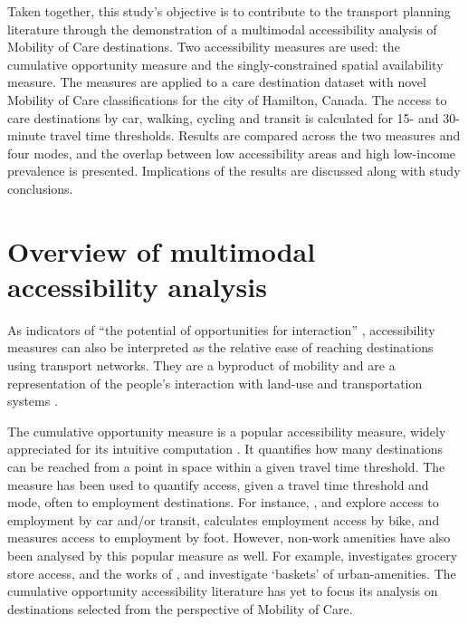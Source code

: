 \documentclass[
  authoryear,
  preprint,
  3p]{elsarticle}
\begin{document}
Taken together, this study's objective is to contribute to the transport
planning literature through the demonstration of a multimodal
accessibility analysis of Mobility of Care destinations. Two
accessibility measures are used: the cumulative opportunity measure and
the singly-constrained spatial availability measure. The measures are
applied to a care destination dataset with novel Mobility of Care
classifications for the city of Hamilton, Canada. The access to care
destinations by car, walking, cycling and transit is calculated for 15-
and 30-minute travel time thresholds. Results are compared across the
two measures and four modes, and the overlap between low accessibility
areas and high low-income prevalence is presented. Implications of the
results are discussed along with study conclusions.

\section{Overview of multimodal accessibility
analysis}\label{overview-of-multimodal-accessibility-analysis}

As indicators of ``the potential of opportunities for interaction''
\citep{hansenHowAccessibilityShapes1959}, accessibility measures can
also be interpreted as the relative ease of reaching destinations using
transport networks. They are a byproduct of mobility and are a
representation of the people's interaction with land-use and
transportation systems
\citep{hansenHowAccessibilityShapes1959, handyAccessibilityIdeaWhose2020, elgeneidyMakingAccessibilityWork2021}.

The cumulative opportunity measure is a popular accessibility measure,
widely appreciated for its intuitive computation
\citep{handyAccessibilityIdeaWhose2020, handyMeasuringAccessibilityExploration1997, kelobonyeRelativeAccessibilityAnalysis2019, chengInvestigatingWalkingAccessibility2019}.
It quantifies how many destinations can be reached from a point in space
within a given travel time threshold. The measure has been used to
quantify access, given a travel time threshold and mode, often to
employment destinations. For instance,
\citet{kapatsilaResolvingAccessibilityDilemma2023},
\citet{deboosereEvaluatingEquityAccessibility2018a} and
\citet{tomasiello2023time} explore access to employment by car and/or
transit, \citet{faghihimaniCycleAccessibilityLevel2019} calculates
employment access by bike, and
\citet{singhCumulativeOpportunitybasedAccessibility2022} measures access
to employment by foot. However, non-work amenities have also been
analysed by this popular measure as well. For example,
\citet{hosford15minuteCityReach2022} investigates grocery store access,
and the works of \citet{mccahillNonworkAccessibilityRelated2018},
\citet{klumpenhouwerFlexibleFrameworkMeasuring2021} and
\citet{chengInvestigatingWalkingAccessibility2019} investigate `baskets'
of urban-amenities. The cumulative opportunity accessibility literature
has yet to focus its analysis on destinations selected from the
perspective of Mobility of Care.
\end{document}
